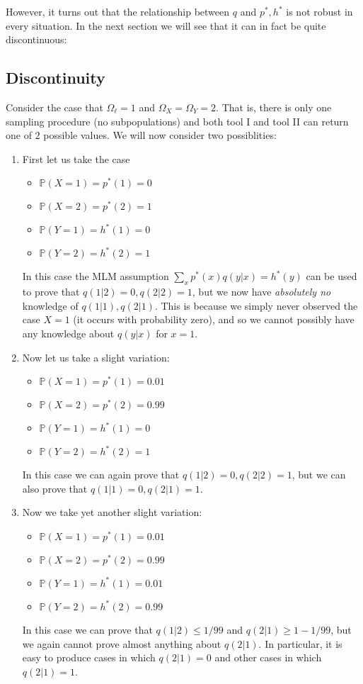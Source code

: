 However, it turns out that the relationship between $q$ and $p^*,h^*$ is not robust in every situation.  In the next section we will see that it can in fact be quite discontinuous:

\subsection{Discontinuity}

Consider the case that $\Omega_\ell = 1$ and $\Omega_X=\Omega_Y=2$.  That is, there is only one sampling procedure (no subpopulations) and both tool I and tool II can return one of $2$ possible values.  We will now consider two possiblities:
\begin{enumerate}
\item First let us take the case
    \begin{itemize}
    \item $\mathbb{P}(X=1)=p^*(1)=0$
    \item $\mathbb{P}(X=2)=p^*(2)=1$
    \item $\mathbb{P}(Y=1)=h^*(1)=0$
    \item $\mathbb{P}(Y=2)=h^*(2)=1$
    \end{itemize}
    In this case the MLM assumption $\sum_x p^*(x)q(y|x)=h^*(y)$ can be used to prove that $q(1|2)=0,q(2|2)=1$, but we now have \emph{absolutely no} knowledge of $q(1|1),q(2|1)$.  This is because we simply never observed the case $X=1$ (it occurs with probability zero), and so we cannot possibly have any knowledge about $q(y|x)$ for $x=1$.  
\item Now let us take a slight variation:
    \begin{itemize}
    \item $\mathbb{P}(X=1)=p^*(1)=0.01$
    \item $\mathbb{P}(X=2)=p^*(2)=0.99$
    \item $\mathbb{P}(Y=1)=h^*(1)=0$
    \item $\mathbb{P}(Y=2)=h^*(2)=1$
    \end{itemize}
    In this case we can again prove that $q(1|2)=0,q(2|2)=1$, but we can also prove that $q(1|1)=0,q(2|1)=1$.  
\item Now we take yet another slight variation:
    \begin{itemize}
    \item $\mathbb{P}(X=1)=p^*(1)=0.01$
    \item $\mathbb{P}(X=2)=p^*(2)=0.99$
    \item $\mathbb{P}(Y=1)=h^*(1)=0.01$
    \item $\mathbb{P}(Y=2)=h^*(2)=0.99$
    \end{itemize}
    In this case we can prove that $q(1|2)\leq 1/99$ and $q(2|1)\geq 1-1/99$, but we again cannot prove almost anything about $q(2|1)$.  In particular, it is easy to produce cases in which $q(2|1)=0$ and other cases in which $q(2|1)=1$.  

\end{enumerate}

